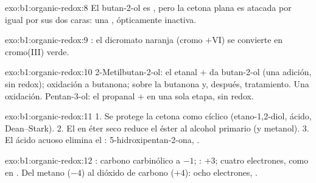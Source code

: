 \begin{solution}{exo:b1:organic-redox:8}
El butan-2-ol es , pero la cetona plana es atacada por igual por
sus dos caras: una , ópticamente inactiva.
\end{solution}

\begin{solution}{exo:b1:organic-redox:9}
: el
dicromato naranja (cromo $+$VI) se convierte en cromo(III) verde.
\end{solution}

\begin{solution}{exo:b1:organic-redox:10}
2-Metilbutan-2-ol: el etanal +  da butan-2-ol (una
adición, sin redox); oxidación a butanona;  sobre la
butanona y, después, tratamiento. Una oxidación. Pentan-3-ol: el
propanal +  en una sola etapa, sin redox.
\end{solution}

\begin{solution}{exo:b1:organic-redox:11}
1. Se protege la cetona como  cíclico (etano-1,2-diol, ácido,
Dean--Stark). 2. El  en éter seco reduce el éster al alcohol
primario (y metanol). 3. El ácido acuoso elimina el :
5-hidroxipentan-2-ona, .
\end{solution}

\begin{solution}{exo:b1:organic-redox:12}
: carbono carbinólico a $-1$; : $+3$; cuatro
electrones, como en . Del metano
($-4$) al dióxido de carbono ($+4$): ocho electrones,
.
\end{solution}

